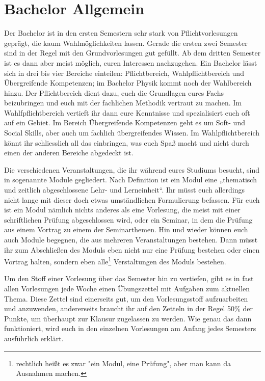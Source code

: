 \section{Bachelor Allgemein}
Der Bachelor ist in den ersten Semestern sehr stark von Pflichtvorlesungen
geprägt, die kaum Wahlmöglichkeiten lassen. Gerade die ersten zwei Semester
sind in der Regel mit den Grundvorlesungen gut gefüllt. Ab dem dritten Semester
ist es dann aber meist möglich, euren Interessen nachzugehen.
Ein Bachelor lässt sich in drei bis vier Bereiche einteilen: Pflichtbereich,
Wahlpflichtbereich und Übergreifende Kompetenzen; im Bachelor Physik kommt noch
der Wahlbereich hinzu.
Der Pflichtbereich dient dazu, euch die Grundlagen eures Fachs beizubringen und
euch mit der fachlichen Methodik vertraut zu machen.  Im Wahlfpflichtbereich
vertieft ihr dann eure Kenntnisse und spezialisiert euch oft auf ein Gebiet. Im
Bereich Übergreifende Kompetenzen geht es um Soft- und Social Skills, aber auch
um fachlich übergreifendes Wissen.  Im Wahlpflichtbereich könnt ihr
schliesslich all das einbringen, was euch Spaß macht und nicht durch einen der
anderen Bereiche abgedeckt ist.

Die verschiedenen Veranstaltungen, die ihr während eures Studiums besucht, sind
in sogenannte Module gegliedert. Nach Definition ist ein Modul eine „thematisch
und zeitlich abgeschlossene Lehr- und Lerneinheit“. Ihr müsst euch allerdings
nicht lange mit dieser doch etwas umständlichen Formulierung befassen. Für euch
ist ein Modul nämlich nichts anderes als eine Vorlesung, die meist mit einer
schriftlichen Prüfung abgeschlossen wird, oder ein Seminar, in dem die Prüfung
aus einem Vortrag zu einem der Seminarthemen. Hin und wieder können euch auch
Module begegnen, die aus mehreren Veranstaltungen bestehen. Dann müsst ihr zum
Abschließen des Moduls eben nicht nur eine Prüfung bestehen oder einen Vortrag
halten, sondern eben alle\footnote{rechtlich heißt es zwar "ein Modul, eine
Prüfung", aber man kann da Ausnahmen machen.} Verstaltungen des Moduls bestehen.

Um den Stoff einer Vorlesung über das Semester hin zu vertiefen, gibt es in
fast allen Vorlesungen jede Woche einen Übungszettel mit Aufgaben zum aktuellen
Thema. Diese Zettel sind einerseits gut, um den Vorlesungsstoff aufzuarbeiten
und anzuwenden, andererseits braucht ihr auf den Zetteln in der Regel 50\% der
Punkte, um überhaupt zur Klausur zugelassen zu werden. Wie genau das dann
funktioniert, wird euch in den einzelnen Vorlesungen am Anfang jedes Semesters
ausführlich erklärt.

